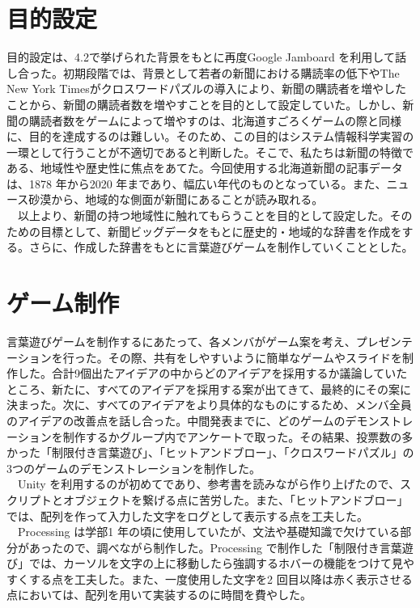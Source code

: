 \section{目的設定}
目的設定は、4.2で挙げられた背景をもとに再度Google Jamboard を利用して話し合った。初期段階では、背景として若者の新聞における購読率の低下やThe New York Timesがクロスワードパズルの導入により、新聞の購読者を増やしたことから、新聞の購読者数を増やすことを目的として設定していた。しかし、新聞の購読者数をゲームによって増やすのは、北海道すごろくゲームの際と同様に、目的を達成するのは難しい。そのため、この目的はシステム情報科学実習の一環として行うことが不適切であると判断した。そこで、私たちは新聞の特徴である、地域性や歴史性に焦点をあてた。今回使用する北海道新聞の記事データは、1878 年から2020 年まであり、幅広い年代のものとなっている。また、ニュース砂漠から、地域的な側面が新聞にあることが読み取れる。\\
　以上より、新聞の持つ地域性に触れてもらうことを目的として設定した。そのための目標として、新聞ビッグデータをもとに歴史的・地域的な辞書を作成をする。さらに、作成した辞書をもとに言葉遊びゲームを制作していくこととした。

\newpage
\section{ゲーム制作}
言葉遊びゲームを制作するにあたって、各メンバがゲーム案を考え、プレゼンテーションを行った。その際、共有をしやすいように簡単なゲームやスライドを制作した。合計9個出たアイデアの中からどのアイデアを採用するか議論していたところ、新たに、すべてのアイデアを採用する案が出てきて、最終的にその案に決まった。次に、すべてのアイデアをより具体的なものにするため、メンバ全員のアイデアの改善点を話し合った。中間発表までに、どのゲームのデモンストレーションを制作するかグループ内でアンケートで取った。その結果、投票数の多かった「制限付き言葉遊び」、「ヒットアンドブロー」、「クロスワードパズル」の3つのゲームのデモンストレーションを制作した。\\
　Unity を利用するのが初めてであり、参考書を読みながら作り上げたので、スクリプトとオブジェクトを繋げる点に苦労した。また、「ヒットアンドブロー」では、配列を作って入力した文字をログとして表示する点を工夫した。\\
　Processing は学部1 年の頃に使用していたが、文法や基礎知識で欠けている部分があったので、調べながら制作した。Processing で制作した「制限付き言葉遊び」では、カーソルを文字の上に移動したら強調するホバーの機能をつけて見やすくする点を工夫した。また、一度使用した文字を2 回目以降は赤く表示させる点においては、配列を用いて実装するのに時間を費やした。

